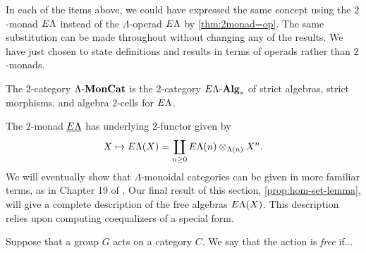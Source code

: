 \begin{rem}\label{rem:elambda=el}
In each of the items above, we could have expressed the same concept using the $2$-monad $E\Lambda$ instead of the $\Lambda$-operad $E\Lambda$ by \cref{thm:2monad=op}.
The same substitution can be made throughout without changing any of the results.
We have just chosen to state definitions and results in terms of operads rather than $2$-monads.
\end{rem}

\begin{rem}\label{rem:strictness-lmc}
\end{rem}

\begin{Defi}
The $2$-category $\Lambda\mbox{-}\mathbf{MonCat}$ is the $2$-category $E\Lambda\mbox{-}\mathbf{Alg}_{s}$ of strict algebras, strict morphisms, and algebra $2$-cells for $E\Lambda$.
\end{Defi}


The $2$-monad $\underline{E\Lambda}$ has underlying 2-functor given by
  \[
    X \mapsto E\Lambda(X) = \coprod_{n \geq 0} E\Lambda(n) \otimes_{\Lambda(n)} X^{n}.
  \]
We will eventually show that $\Lambda$-monoidal categories can be given in more familiar terms, as in Chapter 19 of \cite{yau_infinity_2021}.
Our final result of this section, \cref{prop:hom-set-lemma}, will give a complete description of the free algebras $E\Lambda(X)$.
This description relies upon computing coequalizers of a special form.

\begin{Defi}\label{Defi:free-action}
Suppose that a group $G$ acts on a category $C$. We say that the action is \emph{free} if...
\end{Defi}

